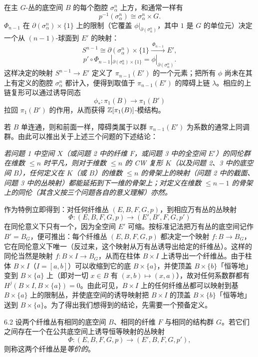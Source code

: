 在主 $G$-丛的底空间 $B$ 的每个胞腔 $\sigma^n_\alpha$ 上方，和通常一样有
\[
p^{-1}(\sigma^n_\alpha)\cong\sigma^n_\alpha\times G.
\]
$\Phi_{n-1}$ 在 $\partial(\sigma^n_\alpha)\times\{1\}$ 上的限制（它覆盖 $\phi|_{\partial(\sigma^n_\alpha)}$，其中 $1$ 是 $G$ 的单位元）决定一个从 $(n-1)$-球面到 $E'$ 的映射：
\[
S^{n-1}\cong\partial(\sigma^n_\alpha)\times\{1\}\xrightarrow{\ \Phi_{n-1}\ }E',
\]
\[
p'\circ\Phi_{n-1}|_{\partial(\sigma^n_\alpha)\times\{1\}}=\phi|_{\partial(\sigma^n_\alpha)}.
\]
这样决定的映射 $S^{n-1}\to E'$ 定义了 $\pi_{n-1}(E')$ 的一个元素；把所有 $\phi$ 尚未在其上有定义的胞腔 $\sigma^n_\alpha$ 都计入，便得到取值于 $\pi_{n-1}(E')$ 的障碍上链 $\lambda$。相应的上链复形可以通过诱导同态
\[
\phi_*:\pi_1(B)\longrightarrow\pi_1(B')
\]
拉回 $\pi_1(B')$ 的作用，从而获得 $\mathbb{Z}[\pi_1(B)]$-模结构。

若 $B$ 单连通，则和前面一样，障碍类属于以群 $\pi_{n-1}(E')$ 为系数的通常上同调群。由此可以推出关于上述三个问题的下述结论：

\emph{若问题 1 中空间 $X$（或问题 2 中的纤维 $F$，或问题 3 中的全空间 $E'$）的同伦群在维数 $\le n$ 时平凡，则对于维数 $\le n$ 的 CW 复形 $K$（以及问题 2、3 中的底空间 $B$），任何定义在 $K$（或 $B$）的维数 $\le n$ 的骨架上的映射（问题 2 中的截面、问题 3 中的丛映射）都能延拓到下一维的骨架上；对定义在维数 $\le n-1$ 的骨架上的同伦（其含义按三个问题各自的意义理解）亦然。}

作为特例立即得到：对任何纤维丛 $(E,B,F,G,p)$，到相应万有丛的丛映射
\[
\Phi:(E,B,F,G,p)\longrightarrow(E',B',F,G,p')
\]
在同伦意义下只有一个，因为全空间 $E'$ 可缩。按标准记法把万有丛的底空间记作 $B'=B_G$，便可推出：每个纤维丛 $(E,B,F,G,p)$ 都决定一个映射 $f:B\to B_G$，它在同伦意义下唯一（反过来，这个映射从万有丛诱导出给定的纤维丛）。这样的同伦当然是映射 $f:B\times I\to B_G$，从而在柱体 $B\times I$ 上诱导出一个纤维丛。由于柱体 $B\times I$（$I=[a,b]$）可以收缩到它的底 $B\times\{a\}$，并使顶盖 $B\times\{b\}$「恒等地」变到 $B\times\{a\}$ 上（即对一切 $x\in B$ 有 $(x,b)\mapsto(x,a)$），故对任何系数群都有 $H^j(B\times I,B\times\{a\})=0$。由此可见，$B\times I$ 上的任何纤维丛都可以映射到基 $B\times\{a\}$ 上的限制丛，并使底空间的诱导映射把 $B\times I$ 的顶盖 $B\times\{b\}$「恒等地」送到 $B\times\{a\}$。为了得出我们想得到的结论，先需要一个预备定义。

\begin{definition*}{6.2}
设两个纤维丛有相同的底空间 $B$、相同的纤维 $F$ 与相同的结构群 $G$。若它们之间存在一个在公共底空间上诱导恒等映射的丛映射
\[
\Phi:(E,B,F,G,p)\longrightarrow(E',B,F,G,p'),
\]
则称这两个纤维丛是\emph{等价的}。
\end{definition*}


